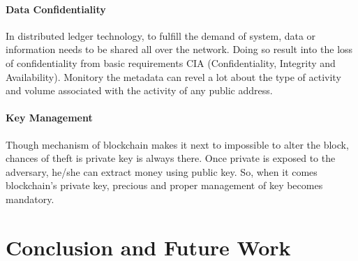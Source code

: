 \documentclass[a4paper,twoside,12pt]{report}
\begin{document}
\begin{spacing}{1.5}
\subsubsection{Data Confidentiality}
In distributed ledger technology, to fulfill the demand of system, data or information needs to be shared all over the network. Doing so result into the loss of confidentiality from basic requirements CIA (Confidentiality, Integrity and Availability). Monitory the metadata can revel a lot about the type of activity and volume associated with the activity of any public address.
\subsubsection{Key Management}
Though mechanism of blockchain makes it next to impossible to alter the block, chances of theft is private key is always there. Once private is exposed to the adversary, he/she can extract money using public key. So, when it comes blockchain's private key, precious and proper management of key becomes mandatory.
\chapter{Conclusion and Future Work}
\label{chaper4}
\end{spacing}
\begin{appendices}
\end{appendices}



\end{document}
